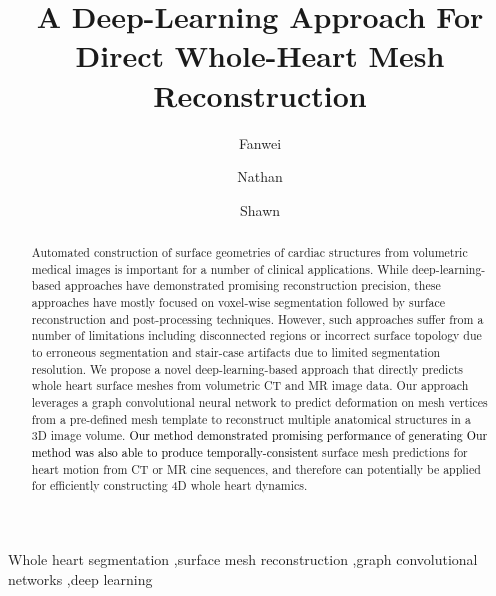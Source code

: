 \documentclass[times,review,preprint,authoryear]{elsarticle}
\begin{document}

\begin{frontmatter}
\title{A Deep-Learning Approach For Direct Whole-Heart Mesh Reconstruction}%


\author[1]{Fanwei }
\author[2]{Nathan }
\author[1]{Shawn }
\address[1]{Mechanical Engineering Department, University of California, Berkeley, Berkeley, CA 94709}
\address[2]{Open Source Medical Software Corporation, Santa Monica, CA}


\begin{abstract}
Automated construction of surface geometries of cardiac structures from volumetric medical images is important for a number of clinical applications. While deep-learning-based approaches have demonstrated promising reconstruction precision, these approaches have mostly focused on voxel-wise segmentation followed by surface reconstruction and post-processing techniques. However, such approaches suffer from a number of limitations including disconnected regions or incorrect surface topology due to erroneous segmentation and stair-case artifacts due to limited segmentation resolution. We propose a novel deep-learning-based approach that directly predicts whole heart surface meshes from volumetric CT and MR image data. Our approach leverages a graph convolutional neural network to predict deformation on mesh vertices from a pre-defined mesh template to reconstruct multiple anatomical structures in a 3D image volume. \textcolor{black}{Our method demonstrated promising performance of generating}  \textcolor{black}{Our method was also able to produce temporally-consistent} surface mesh predictions for heart motion from CT or MR cine sequences, and therefore can potentially be applied for efficiently constructing 4D whole heart dynamics. 
\end{abstract}

\begin{keyword}
\KWD Whole heart segmentation \sep surface mesh reconstruction \sep graph convolutional networks \sep deep learning
\end{keyword}

\end{frontmatter}
\end{document}
